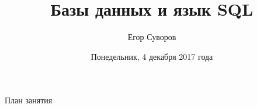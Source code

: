 \documentclass[utf8,xcolor=table]{beamer}
\title{Базы данных и язык SQL}
\author{Егор Суворов}
\institute[СПб АУ]{Курс <<Парадигмы и языки программирования>>, подгруппа 3}
\date[04.12.2017]{Понедельник, 4 декабря 2017 года}
\begin{document}
\begin{frame}
\titlepage
\end{frame}

\begin{frame}{План занятия}
	\tableofcontents
\end{frame}








\end{document}
